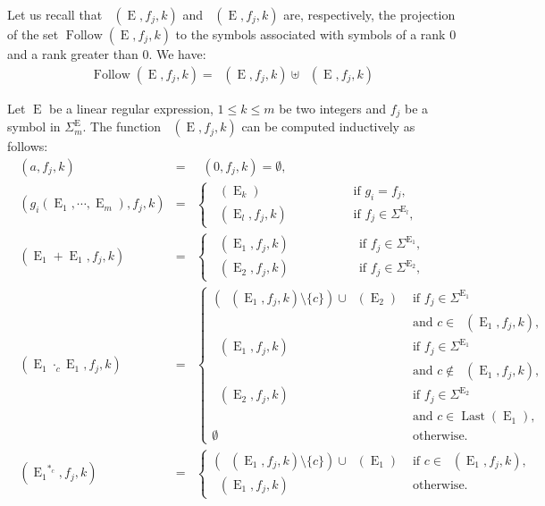 \documentclass{llncs}
\DeclareMathOperator{\Last}{Last}
\DeclareMathOperator{\last}{Fl_0}
\DeclareMathOperator{\Follw}{Fl_>}
\DeclareMathOperator{\Follow}{Follow}
\DeclareMathOperator{\E}{E}
\DeclareMathOperator{\Firs}{Fr_0}
\def\firs#1{\Firs{(#1)}}
\def\Fll#1#2#3{\Follow{(#1,#2,#3)}}
\def\las#1#2#3{\last{(#1,#2,#3)}}
\def\Fw#1#2#3{\Follw{(#1,#2,#3)}}
\begin{document}
Let us recall that $\las{\E}{f_j}{k}$ and $\Fw{\E}{f_j}{k}$ are, respectively, the projection of the set $\Fll{\E}{f_j}{k}$ to the symbols associated with symbols of a rank $0$ and a rank greater than $0$. We have: 
\begin{eqnarray*}
\Fll{\E}{f_j}{k}=\las{\E}{f_j}{k}\uplus\Fw{\E}{f_j}{k}
\end{eqnarray*}
\begin{proposition}\label{a}
Let $\E$ be a linear regular expression, $1\leq k\leq m$ be two integers and $f_j$ be a symbol in $\Sigma^{\E}_m$. 
The function $\las{\E}{f_j}{k}$ can be computed inductively as follows: 
\begin{eqnarray*}
\las{a}{f_j}{k}&=& \las{0}{f_j}{k}=\emptyset,\\
\las{g_i(\E_1, \cdots,\E_m)}{f_j}{k}&=&\left\{
\begin{array}{lll}
\displaystyle\firs{\E_k}& &\;\;\;\;\;\;\;\;\;\;\;\;\mbox{ if } g_i=f_j, \\ 
\las{\E_l}{f_j}{k}& &\;\;\;\;\;\;\;\;\;\;\;\;\mbox{ if } f_j\in \Sigma^{\E_l},
\end{array}\right.\\
\las{\E_1+\E_1}{f_j}{k}&=&\left\{
\begin{array}{ll}
\las{\E_1}{f_j}{k} &\;\;\;\;\;\;\;\;\;\;\;\;\;\;\;\;\mbox{ if }f_j\in \Sigma^{\E_1}, \\ 
\las{\E_2}{f_j}{k} &\;\;\;\;\;\;\;\;\;\;\;\;\;\;\;\;\mbox{ if } f_j\in \Sigma^{\E_2},
\end{array}\right.\\
\las{\E_1\cdot_c\E_1}{f_j}{k}&=&\left\{
\begin{array}{ll}
(\las{\E_1}{f_j}{k}\setminus\{c\})\cup\firs{\E_2}& \mbox{ if }f_j\in \Sigma^{\E_1}\\ 
&\mbox{ and } c\in \las{\E_1}{f_j}{k},\\ 
\las{\E_1}{f_j}{k}&\mbox{ if } f_j\in \Sigma^{\E_1}\\
&\mbox{ and }  c\notin \las{\E_1}{f_j}{k},\\
\las{\E_2}{f_j}{k}&\mbox{ if } f_j\in \Sigma^{\E_2}\\
&\mbox{ and } c\in  \Last(\E_1),\\
\emptyset&\mbox{ otherwise.}
\end{array}\right.\\
 \las{{\E_1}^{*_c}}{f_j}{k}&=&\left\{
\begin{array}{lll}
(\las{\E_1}{f_j}{k}\setminus\{c\})\cup\firs{{\E_1}}&\mbox{ if } c\in \las{\E_1}{f_j}{k},\\
\las{\E_1}{f_j}{k} &\mbox{ otherwise.}
\end{array}\right.
\end{eqnarray*}
\end{proposition}
\end{document}

